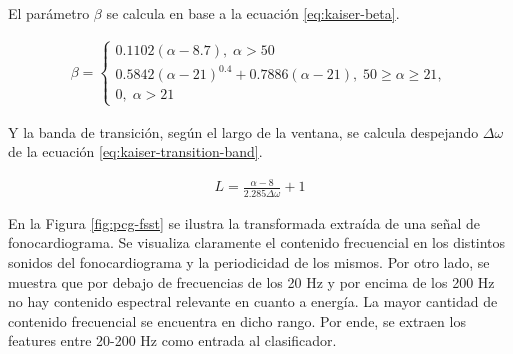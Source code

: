 \indent El parámetro $\beta$ se calcula en base a la ecuación \ref{eq:kaiser-beta}.

\begin{align} \label{eq:kaiser-beta}
  \beta = \begin{cases}
    0.1102(\alpha-8.7), \; \alpha > 50 \\
    0.5842(\alpha-21)^{0.4}+0.7886(\alpha-21), \; 50 \geq \alpha \geq 21, \\
    0, \; \alpha > 21
  \end{cases}
\end{align}

Y la banda de transición, según el largo de la ventana, se calcula despejando $\Delta\omega$ de la ecuación
\ref{eq:kaiser-transition-band}.

\begin{align} \label{eq:kaiser-transition-band}
  L = \frac{\alpha-8}{2.285\Delta\omega} + 1
\end{align}

\indent En la Figura \ref{fig:pcg-fsst} se ilustra la transformada extraída de una señal de fonocardiograma. Se
visualiza claramente el contenido frecuencial en los distintos sonidos del fonocardiograma y la periodicidad de los
mismos. Por otro lado, se muestra que por debajo de frecuencias de los 20 Hz y por encima de los 200 Hz no hay
contenido espectral relevante en cuanto a energía. La mayor cantidad de contenido frecuencial se encuentra en
dicho rango. Por ende, se extraen los features entre 20-200 Hz como entrada al clasificador.

